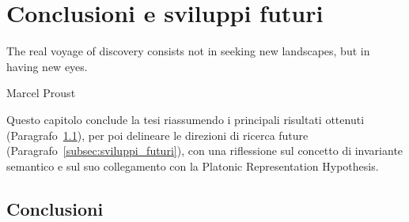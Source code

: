 \section{Conclusioni e sviluppi futuri}
\label{sec:07_conclusioni}

\epigraph{
    The real voyage of discovery consists not in seeking new landscapes, but in having new eyes.
}{Marcel Proust}

Questo capitolo conclude la tesi riassumendo i principali risultati ottenuti (Paragrafo~\ref{subsec:conclusioni}), per poi delineare le direzioni di ricerca future (Paragrafo~\ref{subsec:sviluppi_futuri}), con una riflessione sul concetto di invariante semantico e sul suo collegamento con la Platonic Representation Hypothesis.

\newpage

\subsection{Conclusioni}
\label{subsec:conclusioni}

